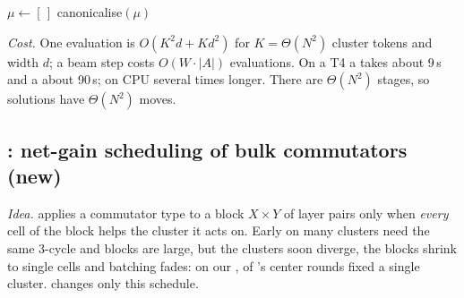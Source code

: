 \begin{algorithm}[t]
\caption{Staged beam search (\FiveA for $N\ge8$)}
\label{alg:staged}
\small
{}
$\mu\leftarrow[\,]$\;
\Return canonicalise$(\mu)$\;
\end{algorithm}

\emph{Cost.} One evaluation is $O(K^2 d+K d^2)$ for $K=\Theta(N^2)$ cluster tokens and width $d$; a beam step costs $O(W\cdot|A|)$
evaluations. On a T4 a  takes about 9\,s and a  about 90\,s; on CPU several times longer. There are $\Theta(N^2)$
stages, so solutions have $\Theta(N^2)$ moves.

\subsection{\FiveC: net-gain scheduling of bulk commutators (new)}
\label{sec:5c}

\emph{Idea.} \Mthree applies a commutator type to a block $X\times Y$ of layer pairs only when \emph{every} cell of the
block helps the cluster it acts on. Early on many clusters need the same 3-cycle and blocks are large, but the clusters
soon diverge, the blocks shrink to single cells and batching fades: on our , \MthreeSingleRoundsTwenty{} of
\Mthree's \MthreeRoundsTwenty{} center rounds fixed a single cluster. \FiveC changes only this schedule.

